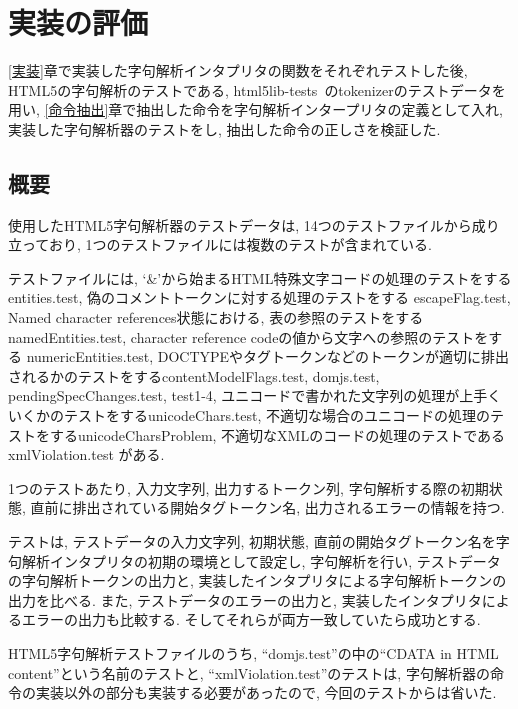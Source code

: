 \documentclass[uplatex,a4j]{jsreport}
\begin{document}
\chapter{実装の評価}
\label{評価}
\ref{実装}章で実装した字句解析インタプリタの関数をそれぞれテストした後, 
HTML5の字句解析のテストである, html5lib-tests~\cite{html5lib-tests}のtokenizerのテストデータを用い, \ref{命令抽出}章で抽出した命令を字句解析インタープリタの定義として入れ, 実装した字句解析器のテストをし, 抽出した命令の正しさを検証した.
\section{概要}
使用したHTML5字句解析器のテストデータは, 14つのテストファイルから成り立っており, 1つのテストファイルには複数のテストが含まれている. 

テストファイルには, 
`\&'から始まるHTML特殊文字コードの処理のテストをするentities.test, 
偽のコメントトークンに対する処理のテストをする escapeFlag.test, 
Named character references状態における, 表の参照のテストをする namedEntities.test, 
character reference codeの値から文字への参照のテストをする numericEntities.test, 
DOCTYPEやタグトークンなどのトークンが適切に排出されるかのテストをするcontentModelFlags.test, domjs.test, pendingSpecChanges.test, test1-4, 
ユニコードで書かれた文字列の処理が上手くいくかのテストをするunicodeChars.test, 
不適切な場合のユニコードの処理のテストをするunicodeCharsProblem, 
不適切なXMLのコードの処理のテストであるxmlViolation.test 
がある. 

1つのテストあたり, 入力文字列, 出力するトークン列, 字句解析する際の初期状態, 直前に排出されている開始タグトークン名, 出力されるエラーの情報を持つ. 

テストは, テストデータの入力文字列, 初期状態, 直前の開始タグトークン名を字句解析インタプリタの初期の環境として設定し, 
字句解析を行い, 
テストデータの字句解析トークンの出力と, 実装したインタプリタによる字句解析トークンの出力を比べる. 
また, テストデータのエラーの出力と, 実装したインタプリタによるエラーの出力も比較する. 
そしてそれらが両方一致していたら成功とする. 

HTML5字句解析テストファイルのうち, ``domjs.test''の中の``CDATA in HTML content''という名前のテストと, ``xmlViolation.test''のテストは, 字句解析器の命令の実装以外の部分も実装する必要があったので, 今回のテストからは省いた. 
\end{document}
